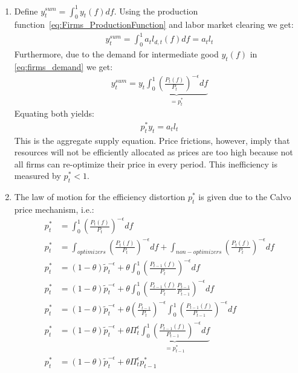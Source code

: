 \begin{enumerate}
\item Define \(y_t^{sum} = \int_{0}^1 y_t(f) df\).
Using the production function~\eqref{eq:Firms_ProductionFunction} and labor market clearing we get:
\begin{align}
	y_t^{sum} = \int_{0}^1 a_t l_{d,t}(f) df = a_t l_t
\end{align}
Furthermore, due to the demand for intermediate good \(y_t(f)\) in \eqref{eq:firms_demand} we get:
\begin{align}
	y_t^{sum} = y_t \underbrace{\int_{0}^1 {\left(\frac{P_t(f)}{P_t}\right)}^{-\epsilon} df}_{=p_t^*}
\end{align}
Equating both yields:
\begin{align}
	p_t^* y_t =  a_t l_t
\end{align}
This is the aggregate supply equation.
Price frictions, however, imply that resources will not be efficiently allocated
  as prices are too high because not all firms can re-optimize their price in every period.
This inefficiency is measured by \(p_t^*<1\).

\item The law of motion for the efficiency distortion \(p_t^*\) is given due to the Calvo price mechanism, i.e.:
\begin{align*}
	p_t^* &= \int_0^1{\left(\frac{P_t(f)}{P_t}\right)}^{-\epsilon} df\\
	p_t^* &= \int_{optimizers} {\left(\frac{P_t(f)}{P_t}\right)}^{-\epsilon} df + \int_{non-optimizers}{\left(\frac{P_t(f)}{P_t}\right)}^{-\epsilon} df\\
	p_t^* & = (1-\theta) \widetilde{p}_t^{-\epsilon} + \theta \int_0^1 {\left(\frac{P_{t-1}(f)}{P_t}\right)}^{-\epsilon} df\\
	p_t^* & = (1-\theta) \widetilde{p}_t^{-\epsilon} + \theta \int_0^1 {\left(\frac{P_{t-1}(f)}{P_t }\frac{P_{t-1}}{P_{t-1}}\right)}^{-\epsilon} df\\
	p_t^* & = (1-\theta) \widetilde{p}_t^{-\epsilon} + \theta {\left(\frac{P_{t-1}}{P_{t}}\right)}^{-\epsilon} \int_0^1 {\left(\frac{P_{t-1}(f)}{P_{t-1} }\right)}^{-\epsilon} df\\
	p_t^* & = (1-\theta) \widetilde{p}_t^{-\epsilon} + \theta \Pi_t^{\epsilon} \underbrace{\int_0^1 {\left(\frac{P_{t-1}(f)}{P_{t-1} }\right)}^{-\epsilon} df}_{=p_{t-1}^*}\\
	p_t^* & = (1-\theta) \widetilde{p}_t^{-\epsilon} + \theta \Pi_t^{\epsilon} p_{t-1}^*
\end{align*}

\end{enumerate}